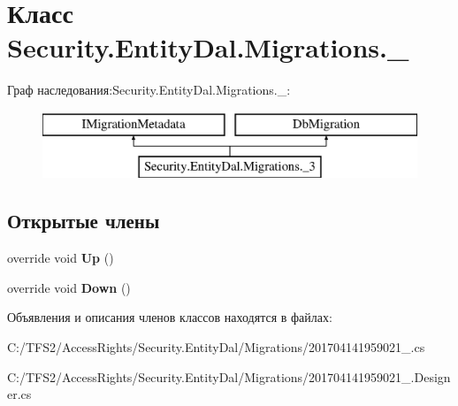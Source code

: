 \hypertarget{class_security_1_1_entity_dal_1_1_migrations_1_1__3}{}\section{Класс Security.\+Entity\+Dal.\+Migrations.\+\_}
\label{class_security_1_1_entity_dal_1_1_migrations_1_1__3}
Граф наследования\+:Security.\+Entity\+Dal.\+Migrations.\+\_\+:\begin{figure}[H]
\begin{center}
\leavevmode
\includegraphics[height=2.000000cm]{d4/d41/class_security_1_1_entity_dal_1_1_migrations_1_1__3}
\end{center}
\end{figure}
\subsection*{Открытые члены}
\begin{DoxyCompactItemize}
\item 
\mbox{\label{class_security_1_1_entity_dal_1_1_migrations_1_1__3_af6d51df5e4e5210cdfd57d77f1795e06}} 
override void {\bfseries Up} ()
\item 
\mbox{\label{class_security_1_1_entity_dal_1_1_migrations_1_1__3_a892f0f4d9868eba0614ad61c86ce9ae2}} 
override void {\bfseries Down} ()
\end{DoxyCompactItemize}


Объявления и описания членов классов находятся в файлах\+:\begin{DoxyCompactItemize}
\item 
C\+:/\+T\+F\+S2/\+Access\+Rights/\+Security.\+Entity\+Dal/\+Migrations/201704141959021\+\_.\+cs\item 
C\+:/\+T\+F\+S2/\+Access\+Rights/\+Security.\+Entity\+Dal/\+Migrations/201704141959021\+\_.\+Designer.\+cs\end{DoxyCompactItemize}
